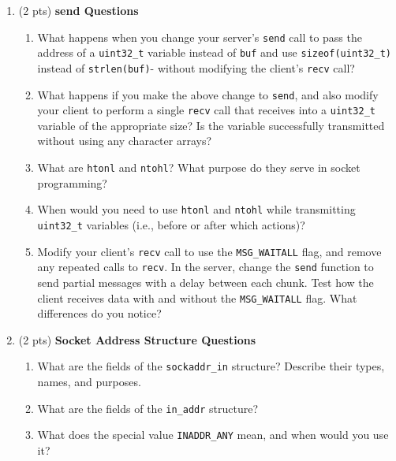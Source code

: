 \documentclass[12pt]{article}
\begin{document}
\begin{enumerate}[label=Q\arabic*:]
    \item (2 pts) \textbf{send Questions}
    \begin{enumerate}[label=(\alph*)]
        \item What happens when you change your server’s \texttt{send} call to pass the address of a \texttt{uint32\_t} variable instead of \texttt{buf} and use \texttt{sizeof(uint32\_t)} instead of \texttt{strlen(buf)}- without modifying the client’s \texttt{recv} call?
        \item What happens if you make the above change to \texttt{send}, and also modify your client to perform a single \texttt{recv} call that receives into a \texttt{uint32\_t} variable of the appropriate size? Is the variable successfully transmitted without using any character arrays?
        \item What are \texttt{htonl} and \texttt{ntohl}? What purpose do they serve in socket programming?
        \item When would you need to use \texttt{htonl} and \texttt{ntohl} while transmitting \texttt{uint32\_t} variables (i.e., before or after which actions)?
        \item Modify your client’s \texttt{recv} call to use the \texttt{MSG\_WAITALL} flag, and remove any repeated calls to \texttt{recv}. In the server, change the \texttt{send} function to send partial messages with a delay between each chunk. Test how the client receives data with and without the \texttt{MSG\_WAITALL} flag. What differences do you notice?
    \end{enumerate}

    \item (2 pts) \textbf{Socket Address Structure Questions}
    \begin{enumerate}[label=(\alph*)]
        \item What are the fields of the \texttt{sockaddr\_in} structure? Describe their types, names, and purposes.
        \item What are the fields of the \texttt{in\_addr} structure?
        \item What does the special value \texttt{INADDR\_ANY} mean, and when would you use it?
    \end{enumerate}


\end{enumerate}
\end{document}
